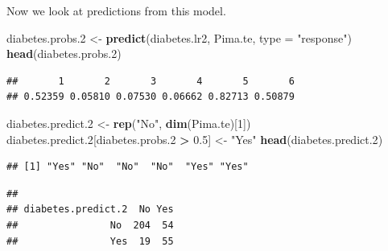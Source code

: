 \documentclass[
]{krantz}
\newenvironment{Shaded}{\begin{snugshade}}{\end{snugshade}}
\newcommand{\DataTypeTok}[1]{\textcolor[rgb]{0.13,0.29,0.53}{#1}}
\newcommand{\DecValTok}[1]{\textcolor[rgb]{0.00,0.00,0.81}{#1}}
\newcommand{\FloatTok}[1]{\textcolor[rgb]{0.00,0.00,0.81}{#1}}
\newcommand{\KeywordTok}[1]{\textcolor[rgb]{0.13,0.29,0.53}{\textbf{#1}}}
\newcommand{\NormalTok}[1]{#1}
\newcommand{\OperatorTok}[1]{\textcolor[rgb]{0.81,0.36,0.00}{\textbf{#1}}}
\newcommand{\StringTok}[1]{\textcolor[rgb]{0.31,0.60,0.02}{#1}}
\begin{document}
Now we look at predictions from this model.

\begin{Shaded}
\begin{Highlighting}[]
\NormalTok{diabetes.probs}\FloatTok{.2}\NormalTok{ \textless{}{-}}\StringTok{ }\KeywordTok{predict}\NormalTok{(diabetes.lr2, Pima.te, }\DataTypeTok{type =} \StringTok{"response"}\NormalTok{)}
\KeywordTok{head}\NormalTok{(diabetes.probs}\FloatTok{.2}\NormalTok{)}
\end{Highlighting}
\end{Shaded}

\begin{verbatim}
##       1       2       3       4       5       6 
## 0.52359 0.05810 0.07530 0.06662 0.82713 0.50879
\end{verbatim}

\begin{Shaded}
\begin{Highlighting}[]
\NormalTok{diabetes.predict}\FloatTok{.2}\NormalTok{ \textless{}{-}}\StringTok{ }\KeywordTok{rep}\NormalTok{(}\StringTok{"No"}\NormalTok{, }\KeywordTok{dim}\NormalTok{(Pima.te)[}\DecValTok{1}\NormalTok{])}
\NormalTok{diabetes.predict}\FloatTok{.2}\NormalTok{[diabetes.probs}\FloatTok{.2} \OperatorTok{\textgreater{}}\StringTok{ }\FloatTok{0.5}\NormalTok{] \textless{}{-}}\StringTok{ "Yes"}
\KeywordTok{head}\NormalTok{(diabetes.predict}\FloatTok{.2}\NormalTok{)}
\end{Highlighting}
\end{Shaded}

\begin{verbatim}
## [1] "Yes" "No"  "No"  "No"  "Yes" "Yes"
\end{verbatim}

\begin{Shaded}
\end{Shaded}

\begin{verbatim}
##                   
## diabetes.predict.2  No Yes
##                No  204  54
##                Yes  19  55
\end{verbatim}

\begin{Shaded}
\end{Shaded}
\end{document}
